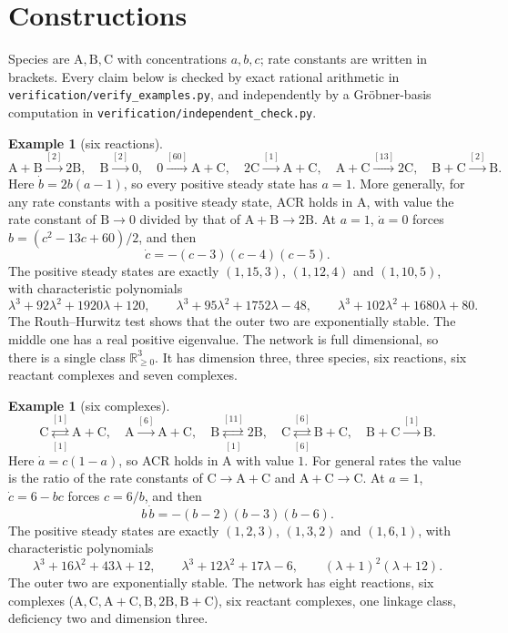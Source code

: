 \documentclass[11pt]{amsart}
\theoremstyle{definition}
\newtheorem{example}[theorem]{Example}
\theoremstyle{remark}
\newcommand{\R}{\mathbb R}
\newcommand{\ce}[1]{\mathrm{#1}}
\begin{document}
\section{Constructions}

Species are $\ce A,\ce B,\ce C$ with concentrations $a,b,c$; rate constants are written in brackets. Every claim below is checked by exact rational arithmetic in \texttt{verification/verify\_examples.py}, and independently by a Gr\"obner-basis computation in \texttt{verification/independent\_check.py}.

\begin{example}[six reactions]\label{ex:six}
\[
 \ce{A}+\ce{B}\xrightarrow{[2]}2\ce{B},\quad \ce{B}\xrightarrow{[2]}0,\quad 0\xrightarrow{[60]}\ce{A}+\ce{C},\quad 2\ce{C}\xrightarrow{[1]}\ce{A}+\ce{C},\quad \ce{A}+\ce{C}\xrightarrow{[13]}2\ce{C},\quad \ce{B}+\ce{C}\xrightarrow{[2]}\ce{B}.
\]
Here $\dot b=2b(a-1)$, so every positive steady state has $a=1$. More generally, for any rate constants with a positive steady state, ACR holds in $\ce A$, with value the rate constant of $\ce B\to0$ divided by that of $\ce A+\ce B\to2\ce B$. At $a=1$, $\dot a=0$ forces $b=(c^2-13c+60)/2$, and then
\[
 \dot c=-(c-3)(c-4)(c-5).
\]
The positive steady states are exactly $(1,15,3)$, $(1,12,4)$ and $(1,10,5)$, with characteristic polynomials
\[
 \lambda^3+92\lambda^2+1920\lambda+120,\qquad \lambda^3+95\lambda^2+1752\lambda-48,\qquad \lambda^3+102\lambda^2+1680\lambda+80 .
\]
The Routh--Hurwitz test shows that the outer two are exponentially stable. The middle one has a real positive eigenvalue. The network is full dimensional, so there is a single class $\R^3_{\ge0}$. It has dimension three, three species, six reactions, six reactant complexes and seven complexes.
\end{example}

\begin{example}[six complexes]\label{ex:cpx}
\[
 \ce{C}\overset{[1]}{\underset{[1]}{\rightleftarrows}}\ce{A}+\ce{C},\quad \ce{A}\xrightarrow{[6]}\ce{A}+\ce{C},\quad \ce{B}\overset{[11]}{\underset{[1]}{\rightleftarrows}}2\ce{B},\quad \ce{C}\overset{[6]}{\underset{[6]}{\rightleftarrows}}\ce{B}+\ce{C},\quad \ce{B}+\ce{C}\xrightarrow{[1]}\ce{B}.
\]
Here $\dot a=c(1-a)$, so ACR holds in $\ce A$ with value $1$. For general rates the value is the ratio of the rate constants of $\ce C\to\ce A+\ce C$ and $\ce A+\ce C\to\ce C$. At $a=1$, $\dot c=6-bc$ forces $c=6/b$, and then
\[
 b\,\dot b=-(b-2)(b-3)(b-6).
\]
The positive steady states are exactly $(1,2,3)$, $(1,3,2)$ and $(1,6,1)$, with characteristic polynomials
\[
 \lambda^3+16\lambda^2+43\lambda+12,\qquad \lambda^3+12\lambda^2+17\lambda-6,\qquad (\lambda+1)^2(\lambda+12).
\]
The outer two are exponentially stable. The network has eight reactions, six complexes ($\ce A,\ce C,\ce A+\ce C,\ce B,2\ce B,\ce B+\ce C$), six reactant complexes, one linkage class, deficiency two and dimension three.
\end{example}
\end{document}
